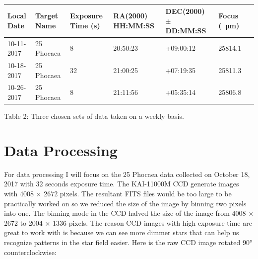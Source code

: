 \documentclass[onecolumn, 12pt, a4paper]{article}
\begin{document}
\hspace*{-.8cm}\begin{tabular}{ |p{2cm}|p{2.5cm}|p{2cm}|p{2.3cm}|p{2.3cm}|p{2.5cm}|p{1.3cm}| }

 \hline
 Local Date & Target Name & Exposure Time (s)& RA(2000) HH:MM:SS & DEC(2000) $\pm$DD:MM:SS & Focus (\SI{}{\micro\metre})\\
 \hline
 10-11-2017 & 25 Phocaea & 8& 20:50:23 & +09:00:12 & 25814.1\\
 \hline
 10-18-2017 & 25 Phocaea & 32& 21:00:25 & +07:19:35 & 25811.3\\
 \hline
 10-26-2017 & 25 Phocaea & 8& 21:11:56 & +05:35:14 & 25806.8\\
 \hline
\end{tabular}

\leavevmode
\newline

\centerline{Table 2: Three chosen sets of data taken on a weekly basis.}
\section{Data Processing}
For data processing I will focus on the 25 Phocaea data collected on October 18, 2017 with 32 seconds exposure time. The KAI-11000M CCD generate images with 4008 $\times$ 2672 pixels. The resultant FITS files would be too large to be practically worked on so we reduced the size of the image by binning two pixels into one. The binning mode in the CCD halved the size of the image from 4008 $\times$ 2672 to 2004 $\times$ 1336 pixels. The reason CCD images with high exposure time are great to work with is because we can see more dimmer stars that can help us recognize patterns in the star field easier. Here is the raw CCD image rotated \ang{90} counterclockwise:
\end{document}
